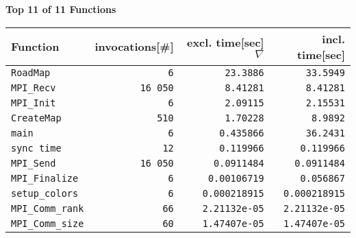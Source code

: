 \documentclass[a4paper,10pt]{article}
\begin{document}
\newpage

\begin{center}\small
{\Large \bf Top 11 of 11 Functions}
\bigskip
\begin{longtable}{|l||r|r|r|}

   \hline
   \bf Function & \bf invocations[\#] & \bf excl. time[sec] $\nabla$ & \bf incl. time[sec] \\
   \hline\hline
  \verb|RoadMap| &   \verb|6| &   \verb|23.3886| &   \verb|33.5949| \\
  \verb|MPI_Recv| &   \verb|16 050| &   \verb|8.41281| &   \verb|8.41281| \\
  \verb|MPI_Init| &   \verb|6| &   \verb|2.09115| &   \verb|2.15531| \\
      \hline
  \verb|CreateMap| &   \verb|510| &   \verb|1.70228| &   \verb|8.9892| \\
  \verb|main| &   \verb|6| &   \verb|0.435866| &   \verb|36.2431| \\
  \verb|sync time| &   \verb|12| &   \verb|0.119966| &   \verb|0.119966| \\
      \hline
  \verb|MPI_Send| &   \verb|16 050| &   \verb|0.0911484| &   \verb|0.0911484| \\
  \verb|MPI_Finalize| &   \verb|6| &   \verb|0.00106719| &   \verb|0.056867| \\
  \verb|setup_colors| &   \verb|6| &   \verb|0.000218915| &   \verb|0.000218915| \\
      \hline
  \verb|MPI_Comm_rank| &   \verb|66| &   \verb|2.21132e-05| &   \verb|2.21132e-05| \\
  \verb|MPI_Comm_size| &   \verb|60| &   \verb|1.47407e-05| &   \verb|1.47407e-05| \\
   \hline
\end{longtable}

\end{center}
\newpage
\end{document}
